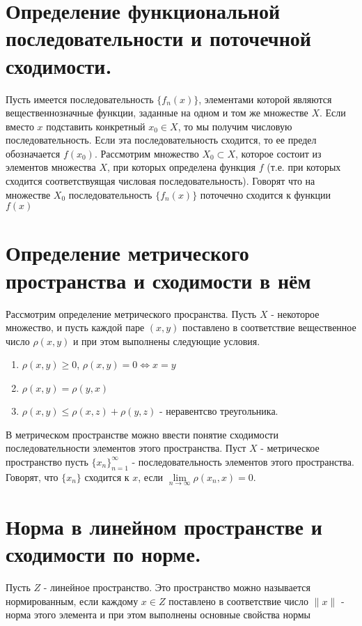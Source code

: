 \documentclass[12pt, a4paper]{article}
\begin{document}
\section{Определение функциональной последовательности и поточечной сходимости.}

Пусть имеется последовательность $\{f_n(x)\}$, элементами которой являются вещественнозначные функции, заданные на одном и том же множестве $X$. Если вместо $x$ подставить конкретный $x_0 \in X$, то мы получим числовую последовательность. Если эта последовательность сходится, то ее предел обозначается $f(x_0)$. Рассмотрим множество $X_0 \subset X$, которое состоит из элементов множества $X$, при которых определена функция $f$ (т.е. при которых сходится соответствуящая числовая последовательность). Говорят что на множестве $X_0$ последовательность $\{f_n(x)\}$ поточечно сходится к функции $f(x)$

\section{Определение метрического пространства и сходимости в нём}
Рассмотрим определение метрического просранства. Пусть $X$ - некоторое множество, и пусть каждой паре $(x, y)$ поставлено в соответствие вещественное число $\rho(x, y)$ и при этом выполнены следующие условия.


\begin{enumerate}
	\item{$\rho(x, y) \geq 0$, $\rho(x, y) = 0 \iff x = y$}
	\item{$\rho(x, y) = \rho(y, x)$}
	\item{$\rho(x, y) \leq \rho(x, z) + \rho(y, z)$ - неравентсво треугольника.}
\end{enumerate}
В метрическом пространстве можно ввести понятие сходимости последовательности элементов этого пространства. Пуст $X$ - метрическое пространство пусть $\{x_n\}_{n=1}^{\infty}$ - последовательность элементов этого пространства. Говорят, что $\{x_n\}$ сходится к $x$, если $\lim\limits_{n \to \infty}\rho(x_n, x) = 0$.


\section{Норма в линейном пространстве и сходимости по норме.}
Пусть $Z$ - линейное пространство. Это пространство можно называется нормированным, если каждому $x \in Z$ поставлено в соответствие число $\|x\|$ - норма этого элемента и при этом выполнены основные свойства нормы
 
\end{document}
